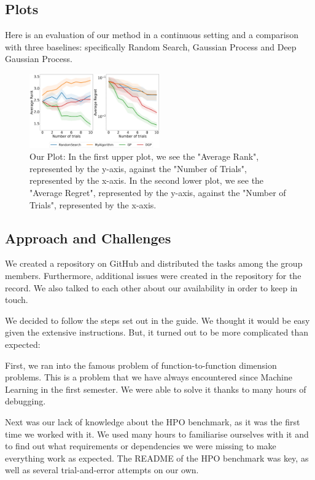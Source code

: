\documentclass[10pt,a4paper,twocolumn]{article}
\begin{document}
{\subsection{Plots}
Here is an evaluation of our method in a continuous setting and a comparison with three baselines: specifically Random Search, Gaussian Process and Deep Gaussian Process.

\begin{figure}[h]
\includegraphics[width=0.5\textwidth]{img/plots.jpeg}
\caption{Our Plot: In the first upper plot, we see the "Average Rank", represented by the y-axis, against the "Number of Trials", represented by the x-axis. In the second lower plot, we see the "Average Regret", represented by the y-axis, against the "Number of Trials", represented by the x-axis.}
\label{fig:ourplot}
\end{figure}

\subsection{Approach and Challenges}
We created a repository on GitHub and distributed the tasks among the group members. Furthermore, additional issues were created in the repository for the record. We also talked to each other about our availability in order to keep in touch.

We decided to follow the steps set out in the guide. We thought it would be easy given the extensive instructions. But, it turned out to be more complicated than expected:

First, we ran into the famous problem of function-to-function dimension problems. This is a problem that we have always encountered since Machine Learning in the first semester. We were able to solve it thanks to many hours of debugging. 

Next was our lack of knowledge about the HPO benchmark, as it was the first time we worked with it. We used many hours to familiarise ourselves with it and to find out what requirements or dependencies we were missing to make everything work as expected. The README of the HPO benchmark was key, as well as several trial-and-error attempts on our own.

}
\end{document}

